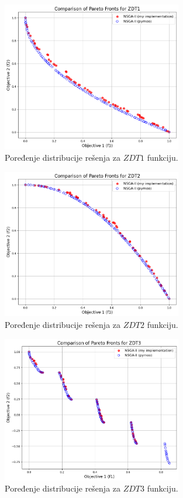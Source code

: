 \documentclass[12pt]{article}
\begin{document}
\begin{figure}[H]
    \centering
    \includegraphics[width=0.7\textwidth]{images/pareto_zdt1.png}
    \caption{Poređenje distribucije rešenja za \( ZDT1 \) funkciju.}
    \label{fig:pareto_zdt1}
\end{figure}

\begin{figure}[H]
    \centering
    \includegraphics[width=0.7\textwidth]{images/pareto_zdt2.png}
    \caption{Poređenje distribucije rešenja za \( ZDT2 \) funkciju.}
    \label{fig:pareto_zdt2}
\end{figure}

\begin{figure}[H]
    \centering
    \includegraphics[width=0.7\textwidth]{images/pareto_zdt3.png}
    \caption{Poređenje distribucije rešenja za \( ZDT3 \) funkciju.}
    \label{fig:pareto_zdt3}
\end{figure}
\end{document}
